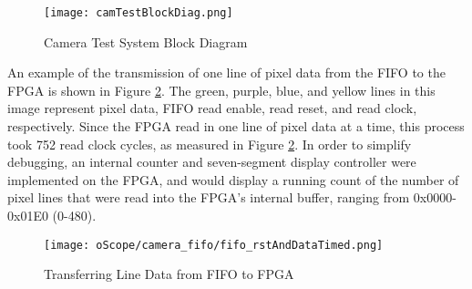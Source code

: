 \begin{figure}[H]
	\centerline{\texttt{[image: camTestBlockDiag.png]}}
	\caption{Camera Test System Block Diagram}
	\label{camTestBDG}
\end{figure}
\par
An example of the transmission of one line of pixel data from the FIFO to the FPGA is shown in Figure \ref{fifoDataOut}.  The green, purple, blue, and yellow lines in this image represent pixel data, FIFO read enable, read reset, and read clock, respectively. Since the FPGA read in one line of pixel data at a time, this process took 752 read clock cycles, as measured in Figure \ref{fifoDataOut}. In order to simplify debugging, an internal counter and seven-segment display controller were implemented on the FPGA, and would display a running count of the number of pixel lines that were read into the FPGA's internal buffer, ranging from 0x0000-0x01E0 (0-480). 
\begin{figure}[H]
	\centerline{\texttt{[image: oScope/camera\_fifo/fifo\_rstAndDataTimed.png]}}
	\caption{Transferring Line Data from FIFO to FPGA}
	\label{fifoDataOut}
\end{figure}

